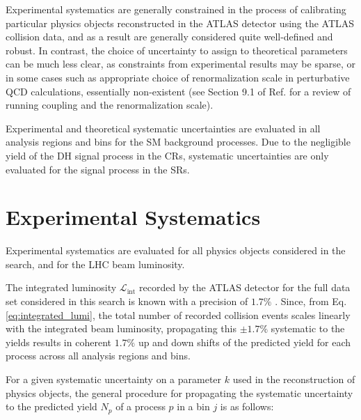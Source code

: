 Experimental systematics are generally constrained in the process of calibrating particular physics objects reconstructed in the ATLAS detector using the ATLAS collision data, and as a result are generally considered quite well-defined and robust. In contrast, the choice of uncertainty to assign to theoretical parameters can be much less clear, as constraints from experimental results may be sparse, or in some cases such as appropriate choice of renormalization scale in perturbative QCD calculations, essentially non-existent (see Section 9.1 of Ref. \cite{pdg_2020} for a review of running coupling and the renormalization scale). 

Experimental and theoretical systematic uncertainties are evaluated in all analysis regions and bins for the SM background processes. Due to the negligible yield of the DH signal process in the CRs, systematic uncertainties are only evaluated for the signal process in the SRs.

\section{Experimental Systematics}

Experimental systematics are evaluated for all physics objects considered in the search, and for the LHC beam luminosity. 

The integrated luminosity \(\mathcal{L}_\text{int}\) recorded by the ATLAS detector for the full data set considered in this search is known with a precision of \(1.7\%\) \cite{ATLAS-CONF-2019-021}. Since, from Eq. \ref{eq:integrated_lumi}, the total number of recorded collision events scales linearly with the integrated beam luminosity, propagating this \(\pm1.7\%\) systematic to the yields results in coherent \(1.7\%\) up and down shifts of the predicted yield for each process across all analysis regions and bins.

For a given systematic uncertainty on a parameter \(k\) used in the reconstruction of physics objects, the general procedure for propagating the systematic uncertainty to the predicted yield \(N_p\) of a process \(p\) in a bin \(j\) is as follows:


